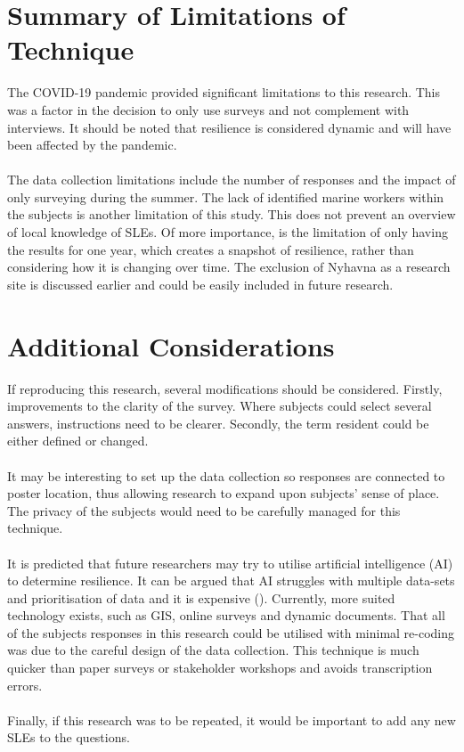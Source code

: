 \paragraph{}


\section{Summary of Limitations of Technique}
The COVID-19 pandemic provided significant limitations to this research. This was a factor in the decision to only use surveys and not complement with interviews. It should be noted that resilience is considered dynamic and will have been affected by the pandemic. 
\paragraph{}
The data collection limitations include the number of responses and the impact of only surveying during the summer. The lack of identified marine workers within the subjects is another limitation of this study. This does not prevent an overview of local knowledge of SLEs. Of more importance, is the limitation of only having the results for one year, which creates a snapshot of resilience, rather than considering how it is changing over time. The exclusion of Nyhavna as a research site is discussed earlier and could be easily included in future research. 


\section{Additional Considerations}
If reproducing this research, several modifications should be considered. Firstly, improvements to the clarity of the survey. Where subjects could select several answers, instructions need to be clearer. Secondly, the term resident could be either defined or changed. 
\paragraph{}
It may be interesting to set up the data collection so responses are connected to poster location, thus allowing research to expand upon subjects' sense of place. The privacy of the subjects would need to be carefully managed for this technique. 
\paragraph{}
It is predicted that future researchers may try to utilise artificial intelligence (AI) to determine resilience. It can be argued that AI struggles with multiple data-sets and prioritisation of data and it is expensive (\cite{shane_you_2019}). Currently, more suited technology exists, such as GIS, online surveys and dynamic documents. That all of the subjects responses in this research could be utilised with minimal re-coding was due to the careful design of the data collection. This technique is much quicker than paper surveys or stakeholder workshops and avoids transcription errors.
\paragraph{}
Finally, if this research was to be repeated, it would be important to add any new SLEs to the questions. 



